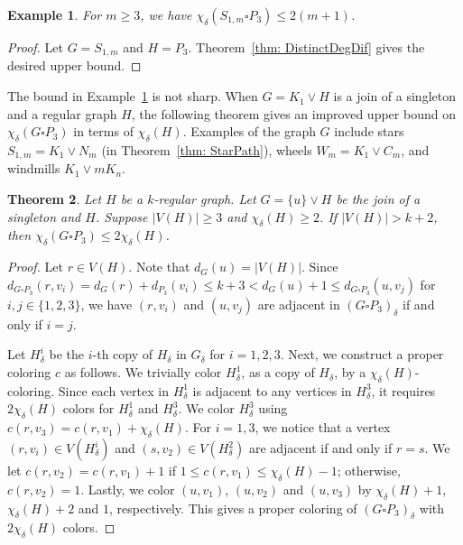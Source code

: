 \documentclass[12pt]{amsart}
\newtheorem{theorem}{Theorem}
\newtheorem{example}[theorem]{Example}
\begin{document}
\begin{example} \label{ex: poor_star_P3}
    For $m\geq 3$, we have $\chi_\delta(S_{1,m}\square P_3) \leq 2(m+1)$.
\end{example}
\begin{proof}
    Let $G=S_{1,m}$ and $H=P_3$. Theorem~\ref{thm: DistinctDegDif} gives the desired upper bound.
\end{proof}

The bound in Example~\ref{ex: poor_star_P3} is not sharp.
When $G = K_1 \vee H$ is a join of a singleton and a regular graph $H$,
the following theorem gives an improved upper bound on $\chi_{\delta}(G\square P_3)$ in terms of $\chi_\delta(H)$.
Examples of the graph $G$ include stars $S_{1,m} = K_1\vee N_m$ (in Theorem~\ref{thm: StarPath}), wheels $W_{m}=K_1\vee C_m$, and windmills $K_1\vee mK_n$.

\begin{theorem} \label{thm:uvH}
    Let $H$ be a $k$-regular graph.
    Let $G=\{u\} \vee H$ be the join of a singleton and $H$.
    Suppose $|V(H)|\geq 3$ and $\chi_{\delta}(H)\geq 2$.
    If $|V(H)| > k+2$, then $\chi_{\delta}(G\square P_3)\leq 2\chi_{\delta}(H)$.
\end{theorem}
\begin{proof}
    Let $r\in V(H)$. 
    Note that $d_G(u)=|V(H)|$.
    Since $d_{G\square P_3}(r,v_i)=d_G(r)+d_{P_3}(v_i)
    \leq k+3
    < d_G(u)+1\leq d_{G\square P_3}(u,v_j)$ for $i,j\in \{1,2,3\}$, we have $(r,v_i)$ and $(u,v_j)$  are adjacent in $(G\square P_3)_\delta$ if and only if $i=j$.

    Let $H_\delta^i$ be the $i$-th copy of $H_\delta$ in $G_\delta$ for $i=1,2,3$.
    Next, we construct a proper coloring $c$ as follows.
    We trivially color $H_{\delta}^1$, as a copy of $H_\delta$, by a $\chi_{\delta}(H)$-coloring.
    Since 
    each vertex in $H_{\delta}^1$ is adjacent to any vertices in $H_{\delta}^3$,
    it requires $2\chi_{\delta}(H)$ colors for $H^1_{\delta}$ and $H^3_{\delta}$.
    We color $H^3_{\delta}$ using $c(r,v_3)=c(r,v_1)+\chi_{\delta}(H)$.
    For $i=1,3$, we notice that a vertex $(r,v_i)\in V(H^i_{\delta})$ and $(s,v_2)\in V(H^2_{\delta})$ are adjacent if and only if $r= s$. 
    We let $c(r,v_2)=c(r,v_1)+1$ if $1\leq c(r,v_1)\leq \chi_{\delta}(H)-1$; otherwise, $c(r,v_2)=1$.
    Lastly, we color $(u,v_1)$, $(u,v_2)$ and $(u,v_3)$ by $\chi_\delta(H)+1$, $\chi_\delta(H)+2$ and $1$, respectively.  
    This gives a proper coloring of $(G\square P_3)_\delta$ with $2\chi_{\delta}(H)$ colors.
\end{proof}
\end{document}
